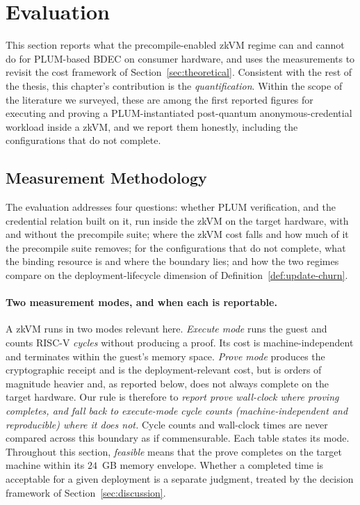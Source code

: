 \section{Evaluation}\label{sec:evaluation}
This section reports what the precompile-enabled zkVM regime can and cannot do for PLUM-based BDEC on consumer hardware, and uses the measurements to revisit the cost framework of Section~\ref{sec:theoretical}. Consistent with the rest of the thesis, this chapter's contribution is the \emph{quantification}. Within the scope of the literature we surveyed, these are among the first reported figures for executing and proving a PLUM-instantiated post-quantum anonymous-credential workload inside a zkVM, and we report them honestly, including the configurations that do not complete.

\subsection{Measurement Methodology}\label{ssec:eq}
The evaluation addresses four questions: whether PLUM verification, and the credential relation built on it, run inside the zkVM on the target hardware, with and without the precompile suite; where the zkVM cost falls and how much of it the precompile suite removes; for the configurations that do not complete, what the binding resource is and where the boundary lies; and how the two regimes compare on the deployment-lifecycle dimension of Definition~\ref{def:update-churn}.

\paragraph{Two measurement modes, and when each is reportable.}
A zkVM runs in two modes relevant here. \emph{Execute mode} runs the guest and counts RISC-V \emph{cycles} without producing a proof. Its cost is machine-independent and terminates within the guest's memory space. \emph{Prove mode} produces the cryptographic receipt and is the deployment-relevant cost, but is orders of magnitude heavier and, as reported below, does not always complete on the target hardware. Our rule is therefore to \emph{report prove wall-clock where proving completes, and fall back to execute-mode cycle counts (machine-independent and reproducible) where it does not.} Cycle counts and wall-clock times are never compared across this boundary as if commensurable. Each table states its mode. Throughout this section, \emph{feasible} means that the prove completes on the target machine within its $24$~GB memory envelope. Whether a completed time is acceptable for a given deployment is a separate judgment, treated by the decision framework of Section~\ref{sec:discussion}.

